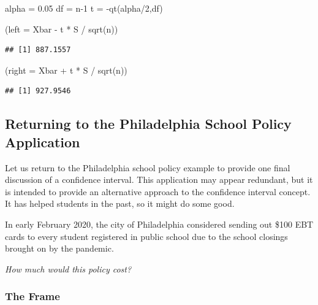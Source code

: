 \documentclass[
]{book}
\newenvironment{Shaded}{\begin{snugshade}}{\end{snugshade}}
\newcommand{\AttributeTok}[1]{\textcolor[rgb]{0.77,0.63,0.00}{#1}}
\newcommand{\DecValTok}[1]{\textcolor[rgb]{0.00,0.00,0.81}{#1}}
\newcommand{\FloatTok}[1]{\textcolor[rgb]{0.00,0.00,0.81}{#1}}
\newcommand{\FunctionTok}[1]{\textcolor[rgb]{0.00,0.00,0.00}{#1}}
\newcommand{\NormalTok}[1]{#1}
\newcommand{\OtherTok}[1]{\textcolor[rgb]{0.56,0.35,0.01}{#1}}
\newcommand{\SpecialCharTok}[1]{\textcolor[rgb]{0.00,0.00,0.00}{#1}}
\begin{document}
\begin{Shaded}
\begin{Highlighting}[]
\NormalTok{alpha }\OtherTok{=} \FloatTok{0.05}
\NormalTok{df }\OtherTok{=}\NormalTok{ n}\DecValTok{{-}1}
\NormalTok{t }\OtherTok{=} \SpecialCharTok{{-}}\FunctionTok{qt}\NormalTok{(alpha}\SpecialCharTok{/}\DecValTok{2}\NormalTok{,df)}

\NormalTok{(}\AttributeTok{left =}\NormalTok{ Xbar }\SpecialCharTok{{-}}\NormalTok{ t }\SpecialCharTok{*}\NormalTok{ S }\SpecialCharTok{/} \FunctionTok{sqrt}\NormalTok{(n))}
\end{Highlighting}
\end{Shaded}

\begin{verbatim}
## [1] 887.1557
\end{verbatim}

\begin{Shaded}
\begin{Highlighting}[]
\NormalTok{(}\AttributeTok{right =}\NormalTok{ Xbar }\SpecialCharTok{+}\NormalTok{ t }\SpecialCharTok{*}\NormalTok{ S }\SpecialCharTok{/} \FunctionTok{sqrt}\NormalTok{(n))}
\end{Highlighting}
\end{Shaded}

\begin{verbatim}
## [1] 927.9546
\end{verbatim}

\hypertarget{returning-to-the-philadelphia-school-policy-application}{%
\subsection{Returning to the Philadelphia School Policy Application}\label{returning-to-the-philadelphia-school-policy-application}}

Let us return to the Philadelphia school policy example to provide one final discussion of a confidence interval. This application may appear redundant, but it is intended to provide an alternative approach to the confidence interval concept. It has helped students in the past, so it might do some good.

In early February 2020, the city of Philadelphia considered sending out \$100 EBT cards to every student registered in public school due to the school closings brought on by the pandemic.

\emph{How much would this policy cost?}

\hypertarget{the-frame}{%
\subsubsection*{The Frame}\label{the-frame}}
\end{document}
